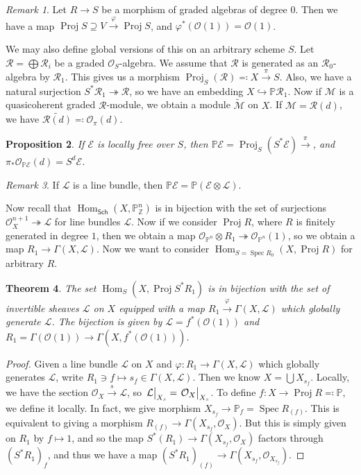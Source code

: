 \documentclass[leqno, openany]{memoir}
\newtheorem{thm}{Theorem}[section]
\newtheorem{prop}[thm]{Proposition}
\theoremstyle{definition}
\theoremstyle{remark}
\newtheorem{rmk}[thm]{Remark}
\theoremstyle{plain}
\theoremstyle{definition}
\theoremstyle{remark}
\newcommand{\Z}{\mathbb{Z}}
\renewcommand{\P}{\mathbb{P}}
\newcommand{\mc}[1]{\mathcal{#1}}
\newcommand{\ms}[1]{\mathsf{#1}}
\newcommand{\wt}[1]{\widetilde{#1}}
\DeclareMathOperator{\Hom}{Hom}
\DeclareMathOperator{\Spec}{Spec}
\DeclareMathOperator{\Proj}{Proj}
\begin{document}
\begin{rmk}
    Let $R \to S$ be a morphism of graded algebras of degree $0$. Then we have a map $\Proj S \supseteq V \xrightarrow{\varphi} \Proj S$, and $\varphi^*(\mc{O}(1)) = \mc{O}(1)$.
\end{rmk}

We may also define global versions of this on an arbitrary scheme $S$. Let $\mc{R} = \bigoplus \mc{R}_i$ be a graded $\mc{O}_S$-algebra. We assume that $\mc{R}$ is generated as an $\mc{R}_0$-algebra by $\mc{R}_1$. This gives us a morphism $\Proj_S(\mc{R}) \eqqcolon X \xrightarrow{\pi} S$. Also, we have a natural surjection $S^* \mc{R}_1 \twoheadrightarrow \mc{R}$, so we have an embedding $X \hookrightarrow \P \mc{R}_1$. Now if $\mc{M}$ is a quasicoherent graded $\mc{R}$-module, we obtain a module $\wt{\mc{M}}$ on $X$. If $\mc{M} = \mc{R}(d)$, we have $\wt{\mc{R}(d)} \eqqcolon \mc{O}_{\pi}(d)$.

\begin{prop}
    If $\mc{E}$ is locally free over $S$, then $\P \mc{E} = \Proj_S(S^* \mc{E}) \xrightarrow{\pi}$, and $\pi_* \mc{O}_{\P \mc{E}}(d) = S^d \mc{E}$. 
\end{prop}

\begin{rmk}
    If $\mc{L}$ is a line bundle, then $\P \mc{E} = \P (\mc{E} \otimes \mc{L})$.
\end{rmk}

Now recall that $\Hom_{\ms{Sch}}(X, \P^n_{\Z})$ is in bijection with the set of surjections $\mc{O}_X^{n+1} \twoheadrightarrow \mc{L}$ for line bundles $\mc{L}$. Now if we consider $\Proj R$, where $R$ is finitely generated in degree $1$, then we obtain a map $\mc{O}_{\P^n} \otimes R_1 \twoheadrightarrow \mc{O}_{\P^n}(1)$, so we obtain a map $R_1 \to \Gamma(X, \mc{L})$. Now we want to consider $\Hom_{S = \Spec R_0}(X, \Proj R)$ for arbitrary $R$.

\begin{thm}
    The set $\Hom_S(X, \Proj S^* R_1)$ is in bijection with the set of invertible sheaves $\mc{L}$ on $X$ equipped with a map $R_1 \xrightarrow{\varphi} \Gamma(X, \mc{L})$ which globally generate $\mc{L}$. The bijection is given by $\mc{L} = f^*(\mc{O}(1))$ and $R_1 = \Gamma(\mc{O}(1)) \to \Gamma(X, f^*(\mc{O}(1)))$.
\end{thm}

\begin{proof}
    Given a line bundle $\mc{L}$ on $X$ and $\varphi \colon R_1 \to \Gamma(X, \mc{L})$ which globally generates $\mc{L}$, write $R_1 \ni f \mapsto s_f \in \Gamma(X, \mc{L})$. Then we know $X = \bigcup X_{s_f}$. Locally, we have the section $\mc{O}_X \xrightarrow{s} \mc{L}$, so $\eval{\mc{L}}_{X_s} = \eval{\mc{O}_X}_{X_s}$. To define $f \colon X \to \Proj R \eqqcolon \P$, we define it locally. In fact, we give morphism $X_{s_f} \to \P_f = \Spec R_{(f)}$. This is equivalent to giving a morphism $R_{(f)} \to \Gamma(X_{s_f}, \mc{O}_X)$. But this is simply given on $R_1$ by $f \mapsto 1$, and so the map $S^*(R_1) \to \Gamma(X_{s_f}, \mc{O}_X)$ factors through ${(S^* R_1)}_f$, and thus we have a map ${(S^* R_1)}_{(f)} \to \Gamma(X_{s_f}, \mc{O}_{X_{s_f}})$.
\end{proof}
\end{document}
